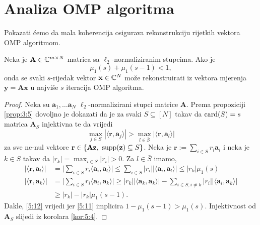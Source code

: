 \documentclass[a4paper,twoside,12pt]{memoir} %
\newcommand{\vect}[1]{\mathbf{#1}}
\renewcommand{\vec}{\vect}
\newcommand{\card}{\text{\normalfont{card}}}
\newcommand{\supp}{\text{\normalfont{supp}}}
\begin{document}
\newpage
\section[Analiza OMP algoritma][Analiza OMP algoritma]{Analiza OMP algoritma}
Pokazati \'cemo da mala koherencija osigurava rekonstrukciju rijetkih vektora OMP algoritmom.
\begin{thm}\label{tm:5:14}
    Neka je $\vec A \in \C^{m \times N}$ matrica sa $\ell_2$-normaliziranim stupcima. Ako je 
    \begin{equation}\label{5:11}
        \mu_1(s) + \mu_1(s-1) < 1, 
    \end{equation}
    onda se svaki $s$-rijedak vektor $\vec x \in \C^N$ mo\v{z}e rekonstruirati iz vektora mjerenja $\vec y = \vec{Ax}$ u najvi\v{s}e $s$ iteracija OMP algoritma.
\end{thm}
\begin{proof}
    Neka su $\vec a_1, \dots \vec a_N$ $\ell_2$-normalizirani stupci matrice $\vec A$. Prema propoziciji \ref{prop:3:5} dovoljno je dokazati da je za svaki $S \subseteq [N]$ takav da $\card(S) = s$ matrica $\vec A_S$ injektivna te da vrijedi
    \begin{equation}\label{5:12}
        \max_{j \in S} |\langle \vec r,\vec a_j \rangle|  > \max_{l \in \bar S} |\langle \vec r, \vec a_l \rangle|
    \end{equation}
    za sve ne-nul vektore $\vec r \in \{\vec{Az},\ \supp(\vec z) \subseteq S\}$. Neka je $\vec r := \sum_{i \in S}r_i \vec a_i$ i neka je $k \in S$ takav da $|r_k| = \max_{i \in S} |r_i| > 0$. Za $l \in \bar S$ imamo,
    \begin{align*}
        |\langle \vec r, \vec a_l \rangle| &= \big | \sum_{i \in S}r_i \langle \vec a_i, \vec a_l \rangle \big | \leq \sum_{i \in S}|r_i||\langle \vec a_i, \vec a_l \rangle| \leq |r_k| \mu_1(s) \\
        |\langle \vec r, \vec a_k \rangle| &= \big | \sum_{i \in S}r_i \langle \vec a_i, \vec a_k \rangle \big |  \geq |r_k| |\langle \vec a_k, \vec a_k \rangle| - \sum_{i \in S, i \neq k}|r_i||\langle \vec a_i, \vec a_k \rangle| \\
        &\geq |r_k| - |r_k|\mu_1(s-1).
    \end{align*}
    Dakle, \eqref{5:12} vrijedi jer \eqref{5:11} implicira $1-\mu_1(s-1) > \mu_1(s)$. Injektivnost od $\vec A_S$ slijedi iz korolara \ref{kor:5:4}.
\end{proof}
\end{document}
